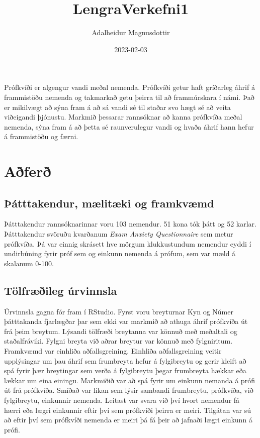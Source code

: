 \documentclass[
]{article}
\title{LengraVerkefni1}
\author{Adalheidur Magnusdottir}
\date{2023-02-03}
\begin{document}
\maketitle

Prófkvíði er algengur vandi meðal nemenda. Prófkvíði getur haft
gríðarleg áhrif á frammistöðu nemenda og takmarkað getu þeirra til að
frammúrskara í námi. Það er mikilvægt að sýna fram á að sá vandi sé til
staðar svo hægt sé að veita viðeigandi þjónustu. Markmið þessarar
rannsóknar að kanna prófkvíða meðal nemenda, sýna fram á að þetta sé
raunverulegur vandi og hvaða áhrif hann hefur á frammistöðu og færni.

\hypertarget{auxf0feruxf0}{%
\section{Aðferð}\label{auxf0feruxf0}}

\hypertarget{uxfeuxe1tttakendur-muxe6lituxe6ki-og-framkvuxe6md}{%
\subsection{Þátttakendur, mælitæki og
framkvæmd}\label{uxfeuxe1tttakendur-muxe6lituxe6ki-og-framkvuxe6md}}

Þátttakendur rannsóknarinnar voru 103 nemendur. 51 kona tók þátt og 52
karlar. Þátttakendur svöruðu kvarðanum \emph{Exam Anxiety Questionnaire}
sem metur prófkvíða. Þá var einnig skrásett hve mörgum klukkustundum
nemendur eyddi í undirbúning fyrir próf sem og einkunn nemenda á prófum,
sem var mæld á skalanum 0-100.

\hypertarget{tuxf6lfruxe6uxf0ileg-uxfarvinnsla}{%
\subsection{Tölfræðileg
úrvinnsla}\label{tuxf6lfruxe6uxf0ileg-uxfarvinnsla}}

Úrvinnsla gagna fór fram í RStudio. Fyrst voru breyturnar Kyn og Númer
þátttakanda fjarlægðar þar sem ekki var markmið að athuga áhrif
prófkvíða út frá þeim breytum. Lýsandi tölfræði breytanna var könnuð með
meðaltali og staðalfráviki. Fylgni breyta við aðrar breytur var könnuð
með fylgniritum. Framkvæmd var einhliða aðfallsgreining. Einhliða
aðfallsgreining veitir upplýsingar um þau áhrif sem frumbreyta hefur á
fylgibreytu og gerir kleift að spá fyrir þær breytingar sem verða á
fylgibreytu þegar frumbreyta hækkar eða lækkar um eina einingu.
Markmiðið var að spá fyrir um einkunn nemanda á prófi út frá prófkvíða.
Smíðað var líkan sem lýsir sambandi frumbreytu, prófkvíða, við
fylgibreytu, einkunnir nemenda. Leitast var svara við því hvort nemendur
fá hærri eða lægri einkunnir eftir því sem prófkvíði þeirra er meiri.
Tilgátan var sú að eftir því sem prófkvíði nemenda er meiri þá fá þeir
að jafnaði lægri einkunn á prófi.
\end{document}
